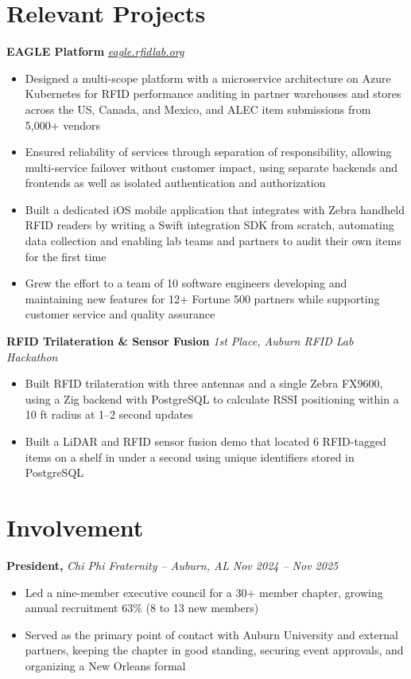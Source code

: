 \documentclass[10pt]{article}       %
\begin{document}
\section*{Relevant Projects}
\textbf{EAGLE Platform} \hfill \textit{\href{https://eagle.rfidlab.org}{eagle.rfidlab.org}} \\
\begin{itemize}
  \item Designed a multi-scope platform with a microservice architecture on Azure Kubernetes for RFID performance auditing in partner warehouses and stores across the US, Canada, and Mexico, and ALEC item submissions from 5,000+ vendors
  \item Ensured reliability of services through separation of responsibility, allowing multi-service failover without customer impact, using separate backends and frontends as well as isolated authentication and authorization
  \item Built a dedicated iOS mobile application that integrates with Zebra handheld RFID readers by writing a Swift integration SDK from scratch, automating data collection and enabling lab teams and partners to audit their own items for the first time
  \item Grew the effort to a team of 10 software engineers developing and maintaining new features for 12+ Fortune 500 partners while supporting customer service and quality assurance
\end{itemize}
\vspace{3pt}

\textbf{RFID Trilateration \& Sensor Fusion} \hfill \textit{1st Place, Auburn RFID Lab Hackathon} \\
\begin{itemize}
  \item Built RFID trilateration with three antennas and a single Zebra FX9600, using a Zig backend with PostgreSQL to calculate RSSI positioning within a 10 ft radius at 1--2 second updates
  \item Built a LiDAR and RFID sensor fusion demo that located 6 RFID-tagged items on a shelf in under a second using unique identifiers stored in PostgreSQL
\end{itemize}

\section*{Involvement}
\textbf{President,} \textit{Chi Phi Fraternity -- Auburn, AL} \hfill \textit{Nov 2024 -- Nov 2025} \\
\begin{itemize}
  \item Led a nine-member executive council for a 30+ member chapter, growing annual recruitment 63\% (8 to 13 new members)
  \item Served as the primary point of contact with Auburn University and external partners, keeping the chapter in good standing, securing event approvals, and organizing a New Orleans formal
\end{itemize}
\vspace{3pt}
\end{document}
